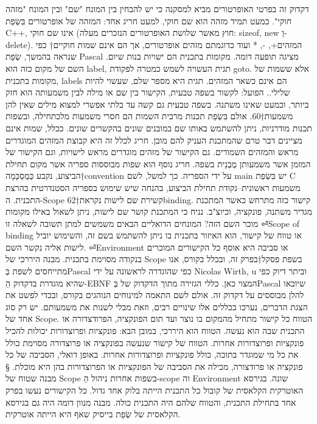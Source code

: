 \begin{טבלא}[!htbp]
      דקדוק זה בפרטי האופרטורים מביא למסקנה כי יש להבחין בין המונח "שם" ובין המונח "מזהה חוקי". כמעט תמיד מזהה הוא שם חוקי, למעט חריג אחד: המזהה של אופרטורים בִּשְׂפַת C++, אינו שם חוקי (חוץ מאשר שלושת האופרטורים הנזכרים מעלה: sizeof, new וְ- delete). המזהים+, -, * ועוד כדוגמתם מזהים אופרטורים, אך הם אינם שמות חוקיים†{ כפי שנראה בהמשך, שְׂפַת Pascal מציגה תופעה דומה. מקומות בתכנית הם ישויות בנות שיום. השם של מקום כזה הוא label, תגית העשויה לשמש כמטרה לפקודת goto. אלא ששמות של מקומות בתכנית, labels הם אינם כשאר המזהים. תגית היא מספר שלם, שעשוי להיות שלילי.}.
      הפועל: לקשור
      בשפה טבעית, הקישור בין שם או מילה לבין משמעותה הוא חזק ביותר, וכמעט שאינו משתנה. בשפה טבעית גם קשה עד בלתי אפשרי למצוא מילים שאין להן משמעות†{60}. אולם בִּשְׂפַת תכנות מרבית השמות הם חסרי משמעות מלכתחילה, ובשפות תכנות מודרניות, ניתן להשתמש באותו שם במובנים שונים בהקשרים שונים.
      ככלל, שמות אינם מציינים דבר טרם שהמתכנת העניק להם מובן. חריג לכלל זה היא קבוצת המזהים המוגדרים מראש והמזהים השמורים. גם הקישור של מזהים מוגדרים מראש לישויות, וגם הקישור של המזמן אשר משמעותן מֻבְנֵית בשפה. חריג נוסף הוא שפות מבוססות ספריה אשר מקום תחילת הביצוע, נקבע כְּמֻסְכָּמָה†{convention} על ידי הספריה. כך למשל, לשם main יש בִּשְׂפַת C משמעות ראשונית--נקודת תחילת הביצוע, בהנחה שיש שימוש בספריה הסטנדרטית בהרצת התכנית.
      ה-Scope
      קשירת שם לישות נקראת†{62}binding. קישור כזה מתרחש כאשר המתכנת מגדיר משתנה, פונקציה, וכיוצ"ב. נניח כי המתכנת קושר שם לישות, ניתן לשאול באילו מקומות מוכר השם הזה? המונחים הדואליים הבאים משמשים למתן תשובה לשאלה זו
⏎Scope of binding או טווח של קישור, הוא האיזור בתכנית בו ניתן להשתמש בשם זה, והשימוש יוביל לישות אליה נקשר השם.
⏎Environment או סביבה היא אוסף כל הקישורים המוכרים בנקודה מסוימת בתכנית.
      מבנה היררכי של Scope
      בשפת פסקל†{בפרק זה, ובכלל בקורס, אנו מתייחסים לשפת בְּPascal כפי שהוגדרה לראשונה על ידי Nicolas Wirth, u וביתר דיוק כפי שהיא מוגדרת בדקדוק הַ-EBNF המצוי כאן. כללי הגזירה מתוך הדקדוק של בְּPascal שיובאו להלן מבוססים על דקדוק זה. אולם לשם התאמה למינוחים הנוהגים בקורס, ובכדי לפשט את הצגת הדברים, נערכו בכללים אלו שינויים רבים, וזאת מבלי לשנות את משמעותם.} יש רק סוג אחד של Scope. הטווח כל קישור מתחיל מהמקום בו נוצר ועד תום הפונקציה, הפרודצדורה או התכנית שבה הוא נעשה. הטווח הוא היררכי, במובן הבא: פונקציות ופרוצדורות יכולות להכיל פונקציות ופרוצדורות אחרות. הטווח של קישור שנעשה בפונקציה או פרוצדורה מסוימת כולל את כל מי שמוגדר בתוכה, כולל פונקציות ופרוצדורות אחרות. באופן דואלי, הסביבה של כל פונקציה או פרודצורה, מכילה את הסביבה של הפונקציות או הפרוצדורות בהן היא מוכלת.
      § מבנה שטוח של Scope
      בשפות אחרות ניהול הַ-scope וה Environment שונה. בגירסא האוטרקית הקלאסית של קובול כל התכנית הייתה בלוק אחד גדול. כל הקישורים נעשו בפרק אחד בתחילת התכנית, והטווח שלהם היה התכנית כולה. מבנה מנוון דומה היה גם בגירסא הקלאסית של שְׂפַת בייסיק שאף היא הייתה אוטרקית.


\end{טבלא}
